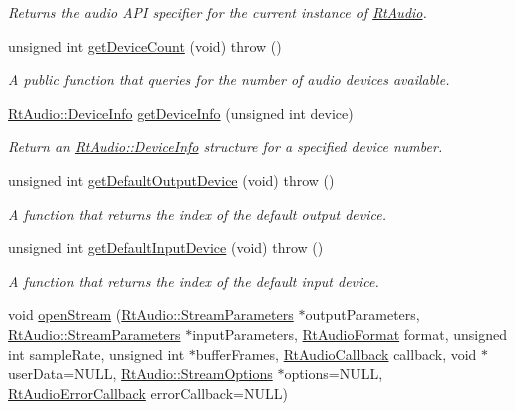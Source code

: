 \begin{DoxyCompactItemize}
\begin{DoxyCompactList}\small\item\em Returns the audio A\+PI specifier for the current instance of \hyperlink{class_rt_audio}{Rt\+Audio}. \end{DoxyCompactList}\item 
unsigned int \hyperlink{class_rt_audio_a747ce2d73803641bbb66d6e78092aa1a}{get\+Device\+Count} (void)  throw ()
\begin{DoxyCompactList}\small\item\em A public function that queries for the number of audio devices available. \end{DoxyCompactList}\item 
\hyperlink{struct_rt_audio_1_1_device_info}{Rt\+Audio\+::\+Device\+Info} \hyperlink{class_rt_audio_a02d7ff44ad1d7eae22283a052f3dfda8}{get\+Device\+Info} (unsigned int device)
\begin{DoxyCompactList}\small\item\em Return an \hyperlink{struct_rt_audio_1_1_device_info}{Rt\+Audio\+::\+Device\+Info} structure for a specified device number. \end{DoxyCompactList}\item 
unsigned int \hyperlink{class_rt_audio_a3a3f3dbe13ea696b521e49cdaaa357bc}{get\+Default\+Output\+Device} (void)  throw ()
\begin{DoxyCompactList}\small\item\em A function that returns the index of the default output device. \end{DoxyCompactList}\item 
unsigned int \hyperlink{class_rt_audio_aad8b94edd3cd379ee300b125750ac6ce}{get\+Default\+Input\+Device} (void)  throw ()
\begin{DoxyCompactList}\small\item\em A function that returns the index of the default input device. \end{DoxyCompactList}\item 
void \hyperlink{class_rt_audio_a6907539d2527775df778ebce32ef1e3b}{open\+Stream} (\hyperlink{struct_rt_audio_1_1_stream_parameters}{Rt\+Audio\+::\+Stream\+Parameters} $\ast$output\+Parameters, \hyperlink{struct_rt_audio_1_1_stream_parameters}{Rt\+Audio\+::\+Stream\+Parameters} $\ast$input\+Parameters, \hyperlink{_rt_audio_8h_aafca92882d25915560018873221e44b8}{Rt\+Audio\+Format} format, unsigned int sample\+Rate, unsigned int $\ast$buffer\+Frames, \hyperlink{_rt_audio_8h_aa96e52a4e057d224cda0c39926e5c652}{Rt\+Audio\+Callback} callback, void $\ast$user\+Data=N\+U\+LL, \hyperlink{struct_rt_audio_1_1_stream_options}{Rt\+Audio\+::\+Stream\+Options} $\ast$options=N\+U\+LL, \hyperlink{_rt_audio_8h_a255b480e1e3c2818d838fb12d13f3123}{Rt\+Audio\+Error\+Callback} error\+Callback=N\+U\+LL)

\end{DoxyCompactItemize}

